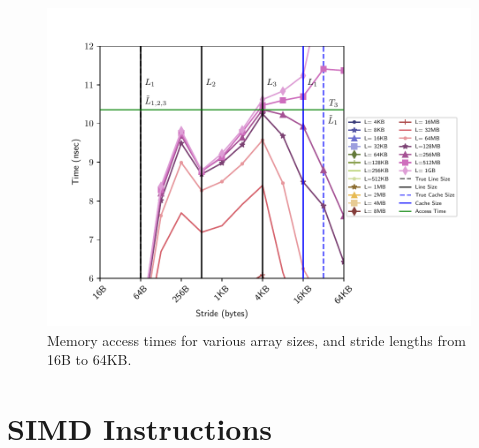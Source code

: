 \documentclass[letterpaper]{article}
\begin{document}
\begin{figure}[H]
  \centering
  \includegraphics[width=\textwidth]{figures/membench_middleupper.pdf}
  \caption{Memory access times for various array sizes, and stride lengths from 16B to 64KB.}
  \label{fig:membench_middleupper}
\end{figure}


\newpage
\section{SIMD Instructions}
\end{document}

